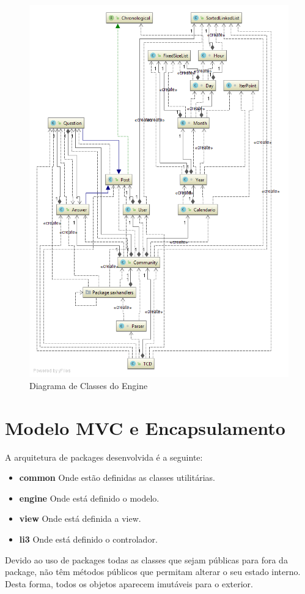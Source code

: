 \documentclass[10pt,a4paper]{report}
\begin{document}
    \begin{figure}[h]
        \centering
        \includegraphics[width=\textwidth]{./images/FullDiagram.png}
        \caption{Diagrama de Classes do Engine}
        \label{fig:fulldiagram}
    \end{figure}


\chapter{Modelo MVC e Encapsulamento}
    A arquitetura de packages desenvolvida é a seguinte:
    \begin{itemize}
        \item \textbf{common} Onde estão definidas as classes utilitárias.
        \item \textbf{engine} Onde está definido o modelo.
        \item \textbf{view} Onde está definida a view.
        \item \textbf{li3} Onde está definido o controlador.
    \end{itemize}
    Devido ao uso de packages todas as classes que sejam públicas para fora da
    package, não têm métodos públicos que permitam alterar o seu estado interno.
    Desta forma, todos os objetos aparecem imutáveis para o exterior.
\end{document}
